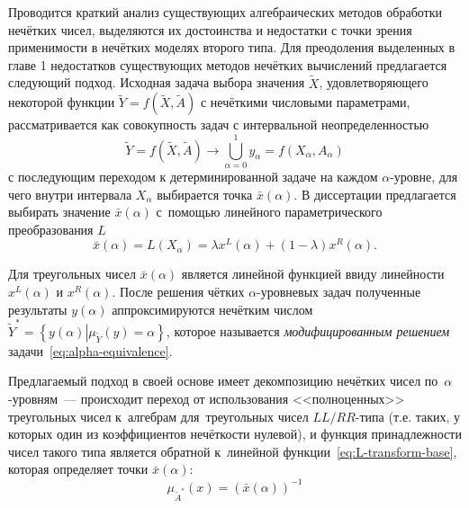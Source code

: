Проводится краткий анализ существующих алгебраических методов обработки нечётких чисел, выделяются их достоинства и недостатки с точки зрения применимости в нечётких моделях второго типа. Для преодоления выделенных в главе 1 недостатков существующих методов нечётких вычислений предлагается следующий подход. Исходная задача выбора значения $\tilde X$, удовлетворяющего некоторой функции $\tilde{Y}=f\left( \tilde{X}, \tilde A \right)$ с нечёткими числовыми параметрами, рассматривается как совокупность задач с интервальной неопределенностью
\begin{equation}
\label{eq:alpha-equivalence}
	\tilde{Y} = f\left( \tilde X, \tilde A \right)\to \bigcup\limits_{\alpha =0}^{1}{y_\alpha}=f\left( X_\alpha, A_\alpha \right)
\end{equation}
с последующим переходом к детерминированной задаче на каждом $\alpha$-уровне, для чего внутри интервала $X_\alpha$ выбирается точка $\bar{x}\left( \alpha  \right)$. В диссертации предлагается выбирать значение $\bar{x}\left( \alpha  \right)$ с~помощью линейного параметрического преобразования $L$
\begin{equation}
  \label{eq:L-transform-base}
  \bar{x}\left( \alpha  \right)=L\left( X_\alpha \right)=\lambda x^L \left( \alpha  \right)+\left( 1-\lambda  \right) x^R \left( \alpha  \right).
\end{equation}

Для треугольных чисел $\bar{x}\left( \alpha  \right)$ является линейной функцией ввиду линейности $x^L\left( \alpha  \right)$ и $x^R\left( \alpha  \right)$. После решения чётких $\alpha$-уровневых задач полученные результаты $y\left( \alpha  \right)$ аппроксимируются нечётким числом $\tilde Y^{*}=\left\{ y(\alpha )\left| \mu_{\tilde Y}(y)=\alpha \right. \right\}$, которое называется \textit{модифицированным решением} задачи~\eqref{eq:alpha-equivalence}.

Предлагаемый подход в своей основе имеет декомпозицию нечётких чисел по~$\alpha$-уровням~--- происходит переход от использования <<полноценных>> треугольных чисел к~алгебрам для~треугольных чисел $LL/RR$-типа (т.е. таких, у которых один из коэффициентов нечёткости нулевой), и функция принадлежности чисел такого типа является обратной к~линейной функции~\eqref{eq:L-transform-base}, которая определяет точки $\bar{x}\left(\alpha \right)$:
\begin{equation}
\label{eq:modified-inverse-function}
  \mu_{\tilde A^{*}}\left( x \right)={\left( \bar{x}\left( \alpha  \right) \right)}^{-1}
\end{equation}

